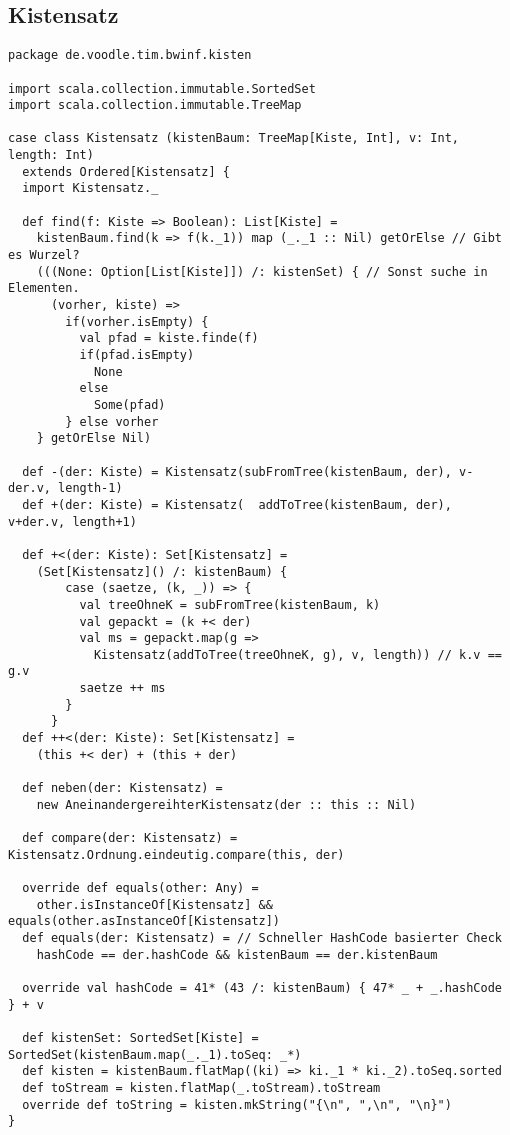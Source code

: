 \subsection{Kistensatz}
\begin{lstlisting}
package de.voodle.tim.bwinf.kisten

import scala.collection.immutable.SortedSet
import scala.collection.immutable.TreeMap

case class Kistensatz (kistenBaum: TreeMap[Kiste, Int], v: Int, length: Int)
  extends Ordered[Kistensatz] {
  import Kistensatz._

  def find(f: Kiste => Boolean): List[Kiste] =
    kistenBaum.find(k => f(k._1)) map (_._1 :: Nil) getOrElse // Gibt es Wurzel?
    (((None: Option[List[Kiste]]) /: kistenSet) { // Sonst suche in Elementen.
      (vorher, kiste) =>
        if(vorher.isEmpty) {
          val pfad = kiste.finde(f)
          if(pfad.isEmpty)
            None
          else
            Some(pfad)
        } else vorher
    } getOrElse Nil)

  def -(der: Kiste) = Kistensatz(subFromTree(kistenBaum, der), v-der.v, length-1)
  def +(der: Kiste) = Kistensatz(  addToTree(kistenBaum, der), v+der.v, length+1)
  
  def +<(der: Kiste): Set[Kistensatz] =
    (Set[Kistensatz]() /: kistenBaum) {
        case (saetze, (k, _)) => {
          val treeOhneK = subFromTree(kistenBaum, k)
          val gepackt = (k +< der)
          val ms = gepackt.map(g =>
            Kistensatz(addToTree(treeOhneK, g), v, length)) // k.v == g.v
          saetze ++ ms
        }
      }
  def ++<(der: Kiste): Set[Kistensatz] =
    (this +< der) + (this + der)

  def neben(der: Kistensatz) =
    new AneinandergereihterKistensatz(der :: this :: Nil)

  def compare(der: Kistensatz) = Kistensatz.Ordnung.eindeutig.compare(this, der)

  override def equals(other: Any) =
    other.isInstanceOf[Kistensatz] && equals(other.asInstanceOf[Kistensatz])
  def equals(der: Kistensatz) = // Schneller HashCode basierter Check
    hashCode == der.hashCode && kistenBaum == der.kistenBaum

  override val hashCode = 41* (43 /: kistenBaum) { 47* _ + _.hashCode } + v

  def kistenSet: SortedSet[Kiste] = SortedSet(kistenBaum.map(_._1).toSeq: _*)
  def kisten = kistenBaum.flatMap((ki) => ki._1 * ki._2).toSeq.sorted
  def toStream = kisten.flatMap(_.toStream).toStream
  override def toString = kisten.mkString("{\n", ",\n", "\n}")
}


\end{lstlisting}
